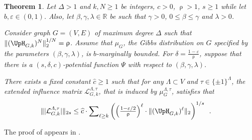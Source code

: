 \documentclass[11pt,reqno]{amsart}
\numberwithin{equation}{section}
\newtheorem{theorem}{Theorem}[section]
\newcommand{\cL}{{\mathcal{L}}}
\newcommand{\applegreen}[1]{ {\color{applegreen}#1}}
\newcommand{\blue}[1]{{\color{blue}#1}}
\newcommand{\bluepigment}[1]{{\color{blue(pigment)}#1}}
\newcommand{\cadmiumgreen}[1]{{\color{cadmiumgreen}#1}}
\newcommand{\darkmagenta}[1]{{\color{darkmagenta}#1}}
\newcommand{\goldenbrown}[1]{{\color{goldenbrown}#1}}
\newcommand{\maxDeg}{{\Delta}}
\newcommand{\potF}{{\Psi}}
\newcommand{\pfs}{\darkmagenta{s}}
\newcommand{\norm}[2]{\goldenbrown{\|} #1 \goldenbrown{\|}_{#2}}
\newcommand{\nnorm}[3]{\goldenbrown{\|} #1\goldenbrown{\|}^{#2}_{#3}}
\newcommand{\abs}[1]{\blue{|}#1\blue{|}}
\newcommand{\NBMatrix}{\cadmiumgreen{\UpH}_{G,\kk}}
\renewcommand{\applegreen}[1]{#1}
\renewcommand{\blue}[1]{#1}
\renewcommand{\bluepigment}[1]{#1}
\renewcommand{\cadmiumgreen}[1]{#1}
\renewcommand{\darkmagenta}[1]{#1}
\renewcommand{\goldenbrown}[1]{#1}
\newcommand{\kk}{\bluepigment{k}}
\newcommand{\kell}{{\color{green(pigment)}\ell}}%
\renewcommand{\kk}{k}
\renewcommand{\kell}{\ell}
\newcommand{\ExtdInfMatrixF}{\applegreen{\cL}^{\Lambda,\tau}_{G,\kk}}
\newcommand{\SingBound}{\uprho}
\begin{document}
\begin{theorem}\label{thrm:InfNormBoundHConj}
Let $\maxDeg > 1$ and $\kk,N\geq 1$ be integers, $c>0$, $\SingBound> 1$, $\pfs\geq 1$ while 
let $b,\varepsilon\in (0,1)$. Also, let $\beta,\gamma, \lambda\in \mathbb{R}$ be such that $\gamma >0$,
$0\leq \beta\leq \gamma$ and $\lambda>0$. 
%

Consider graph $G=(V,E)$ of maximum degree $\maxDeg$ such that 
%
$\nnorm{ (\NBMatrix)^N}{1/N}{2}= \SingBound$.
%
Assume that $\mu_G$, the Gibbs distribution on $G$ specified by the parameters $(\beta, \gamma, \lambda)$,
is $b$-marginally bounded.
%
For $\delta= \frac{1-\varepsilon}{\SingBound}$, suppose that there
is a $(\pfs,\delta,c)$-potential function $\potF$ with respect to $(\beta,\gamma,\lambda)$. 


There exists a fixed constant $\widehat{c} \geq 1$ such that 
for any $\Lambda\subset V$ and $\tau\in \{\pm 1\}^{\Lambda}$, the extended influence matrix 
$\ExtdInfMatrixF$, that is induced by $\mu^{\Lambda,\tau}_G$, satisfies that
\begin{align}\nonumber
\norm{  \abs{ \ExtdInfMatrixF}}{2\pfs} &\leq \widehat{c}\cdot \sum\nolimits_{\kell\geq \kk} 
\left(
 {\textstyle \left(\frac{1-\varepsilon/2}{\SingBound}\right)^{\kell} } \cdot %
% 
\norm{ ( \NBMatrix)^{\kell}}{2} 
 \right)^{1/\pfs}
\enspace.
\end{align}
\end{theorem}

The proof of  appears in .
%
 
\end{document}
